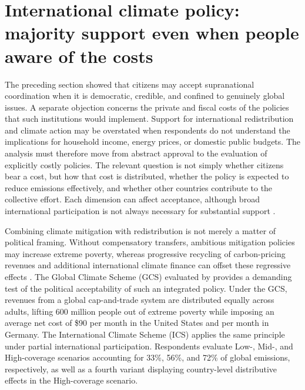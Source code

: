 \documentclass[11pt,a4paper]{article}
\begin{document}
\section{International climate policy: majority support even when people aware of the costs}

The preceding section showed that citizens may accept supranational coordination when it is democratic, credible, and confined to genuinely global issues. A separate objection concerns the private and fiscal costs of the policies that such institutions would implement. Support for international redistribution and climate action may be overstated when respondents do not understand the implications for household income, energy prices, or domestic public budgets. The analysis must therefore move from abstract approval to the evaluation of explicitly costly policies. The relevant question is not simply whether citizens bear a cost, but how that cost is distributed, whether the policy is expected to reduce emissions effectively, and whether other countries contribute to the collective effort. Each dimension can affect acceptance, although broad international participation is not always necessary for substantial support \citep{bechtel_mass_2013,bernauer_how_2015,mcgrath_how_2017}.

Combining climate mitigation with redistribution is not merely a matter of political framing. Without compensatory transfers, ambitious mitigation policies may increase extreme poverty, whereas progressive recycling of carbon-pricing revenues and additional international climate finance can offset these regressive effects \citep{soergel_combining_2021}. The Global Climate Scheme (GCS) evaluated by \citet{fabre_public_2026} provides a demanding test of the political acceptability of such an integrated policy. Under the GCS, revenues from a global cap-and-trade system are distributed equally across adults, lifting 600 million people out of extreme poverty while imposing an average net cost of \$90 per month in the United States and  per month in Germany. The International Climate Scheme (ICS) applies the same principle under partial international participation. Respondents evaluate Low-, Mid-, and High-coverage scenarios accounting for 33\%, 56\%, and 72\% of global emissions, respectively, as well as a fourth variant displaying country-level distributive effects 
in the High-coverage scenario. %
\end{document}
